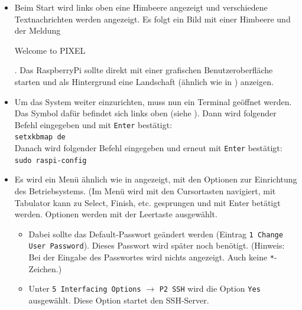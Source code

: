 \begin{itemize}
{		Als letztes wird die Stromversorgung angeschlossen und das RaspberryPi startet automatisch.
		}
	\item {Beim Start wird links oben eine Himbeere angezeigt und verschiedene Textnachrichten werden angezeigt. 
		Es folgt ein Bild mit einer Himbeere und der Meldung \begin{em}Welcome to PIXEL\end{em}. 
		Das RaspberryPi sollte direkt mit einer grafischen Benutzeroberfläche starten und als Hintergrund eine Landschaft (ähnlich wie in ) anzeigen.
		}
	\item {Um das System weiter einzurichten, muss nun ein Terminal geöffnet werden.
		Das Symbol dafür befindet sich links oben (siehe ).
		Dann wird folgender Befehl eingegeben und mit \lstinline|Enter| bestätigt:\\
		\lstinline|setxkbmap de|\\
		Danach wird folgender Befehl eingegeben und erneut mit \lstinline|Enter| bestätigt:\\
		\lstinline|sudo raspi-config|
		}
	\item {Es wird ein Menü ähnlich wie in  angezeigt, mit den Optionen zur Einrichtung des Betriebsystems. 
		(Im Menü wird mit den Cursortasten navigiert, mit Tabulator kann zu Select, Finish, etc. gesprungen und mit Enter betätigt werden. Optionen werden mit der Leertaste ausgewählt.
		\begin{itemize}
		\item {Dabei sollte das Default-Passwort geändert werden (Eintrag \lstinline|1 Change User Password|). Dieses Passwort wird später noch benötigt.
			(Hinweis: Bei der Eingabe des Passwortes wird nichts angezeigt. Auch keine \lstinline|*|-Zeichen.)}
		\item {Unter \lstinline|5 Interfacing Options| $\rightarrow$ \lstinline|P2 SSH| wird die Option \lstinline|Yes| ausgewählt. 
			Diese Option startet den SSH-Server.}

\end{itemize}}
\end{itemize}
